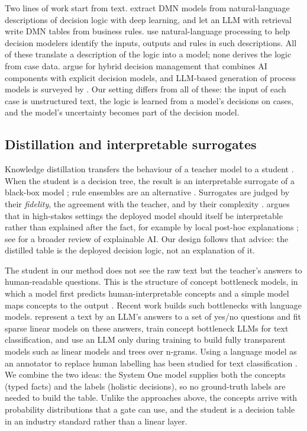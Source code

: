 \documentclass[a4paper,fleqn]{cas-sc}
\theoremstyle{definition}
\begin{document}
Two lines of work start from text. \citet{goossens2023} extract DMN models from natural-language descriptions of decision logic with deep learning, and \citet{cherednichenko2025} let an LLM with retrieval write DMN tables from business rules. \citet{arco2021} use natural-language processing to help decision modelers identify the inputs, outputs and rules in such descriptions. All of these translate a description of the logic into a model; none derives the logic from case data. \citet{bork2023} argue for hybrid decision management that combines AI components with explicit decision models, and LLM-based generation of process models is surveyed by \citet{horner2026}. Our setting differs from all of these: the input of each case is unstructured text, the logic is learned from a model's decisions on cases, and the model's uncertainty becomes part of the decision model.

\subsection{Distillation and interpretable surrogates}
Knowledge distillation transfers the behaviour of a teacher model to a student \citep{hinton2015}. When the student is a decision tree, the result is an interpretable surrogate of a black-box model \citep{craven1996,bastani2017,frosst2017}; rule ensembles are an alternative \citep{friedman2008}. Surrogates are judged by their \emph{fidelity}, the agreement with the teacher, and by their complexity \citep{guidotti2018}. \citet{rudin2019} argues that in high-stakes settings the deployed model should itself be interpretable rather than explained after the fact, for example by local post-hoc explanations \citep{ribeiro2016}; see \citet{arrieta2020} for a broader review of explainable AI. Our design follows that advice: the distilled table is the deployed decision logic, not an explanation of it.

The student in our method does not see the raw text but the teacher's answers to human-readable questions. This is the structure of concept bottleneck models, in which a model first predicts human-interpretable concepts and a simple model maps concepts to the output \citep{koh2020}. Recent work builds such bottlenecks with language models. \citet{benara2024} represent a text by an LLM's answers to a set of yes/no questions and fit sparse linear models on these answers, \citet{sun2025} train concept bottleneck LLMs for text classification, and \citet{singh2023} use an LLM only during training to build fully transparent models such as linear models and trees over n-grams. Using a language model as an annotator to replace human labelling has been studied for text classification \citep{wang2021,gilardi2023}. We combine the two ideas: the System One model supplies both the concepts (typed facts) and the labels (holistic decisions), so no ground-truth labels are needed to build the table. Unlike the approaches above, the concepts arrive with probability distributions that a gate can use, and the student is a decision table in an industry standard rather than a linear layer.
\end{document}
